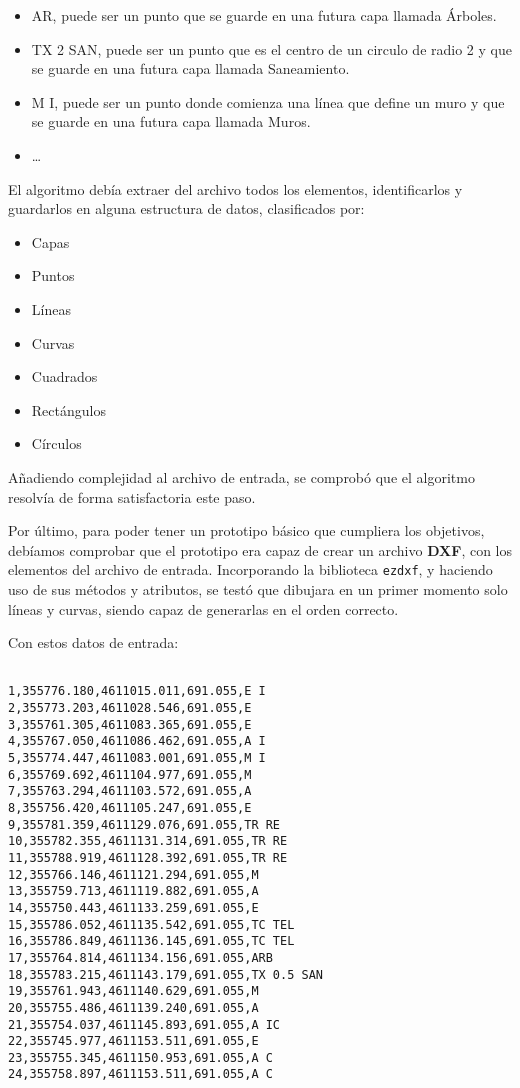 \begin{itemize}
\item AR, puede ser un punto que se guarde en una futura capa llamada Árboles.
\item TX 2 SAN, puede ser un punto que es el centro de un circulo de radio 2 y que se guarde en una futura capa llamada Saneamiento.
\item M I, puede ser un punto donde comienza una línea que define un muro y que se guarde en una futura capa llamada Muros.
\item …
\end{itemize}

El algoritmo debía extraer del archivo todos los elementos, identificarlos y guardarlos en alguna estructura de datos, clasificados por:

\begin{itemize}
\item Capas
\item Puntos
\item Líneas
\item Curvas
\item Cuadrados
\item Rectángulos 
\item Círculos
\end{itemize}

Añadiendo complejidad al archivo de entrada, se comprobó que el algoritmo resolvía de forma satisfactoria este paso.

Por último, para poder tener un prototipo básico que cumpliera los objetivos, debíamos comprobar que el prototipo era capaz de crear un archivo \textbf{DXF}, con los elementos del archivo de entrada. Incorporando la biblioteca \texttt{ezdxf}, y haciendo uso de sus métodos y atributos, se testó que dibujara en un primer momento solo líneas y curvas, siendo capaz de generarlas en el orden correcto.

Con estos datos de entrada:

\begin{verbatim}

1,355776.180,4611015.011,691.055,E I
2,355773.203,4611028.546,691.055,E
3,355761.305,4611083.365,691.055,E
4,355767.050,4611086.462,691.055,A I
5,355774.447,4611083.001,691.055,M I
6,355769.692,4611104.977,691.055,M
7,355763.294,4611103.572,691.055,A
8,355756.420,4611105.247,691.055,E
9,355781.359,4611129.076,691.055,TR RE
10,355782.355,4611131.314,691.055,TR RE
11,355788.919,4611128.392,691.055,TR RE
12,355766.146,4611121.294,691.055,M
13,355759.713,4611119.882,691.055,A
14,355750.443,4611133.259,691.055,E
15,355786.052,4611135.542,691.055,TC TEL
16,355786.849,4611136.145,691.055,TC TEL
17,355764.814,4611134.156,691.055,ARB
18,355783.215,4611143.179,691.055,TX 0.5 SAN
19,355761.943,4611140.629,691.055,M
20,355755.486,4611139.240,691.055,A
21,355754.037,4611145.893,691.055,A IC
22,355745.977,4611153.511,691.055,E
23,355755.345,4611150.953,691.055,A C
24,355758.897,4611153.511,691.055,A C
\end{verbatim}

